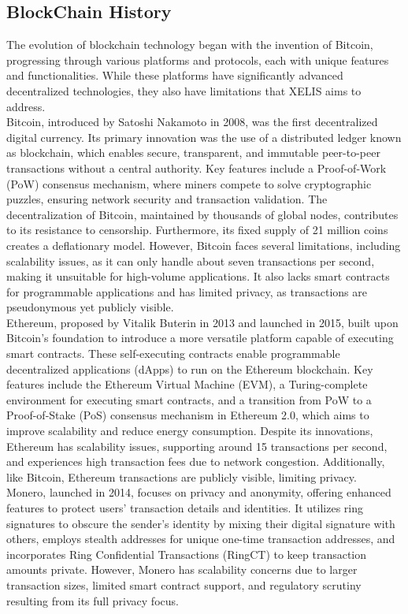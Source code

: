 \documentclass[12pt,a4paper,twocolumn]{article}
\begin{document}
\subsection{BlockChain History}
The evolution of blockchain technology began with the invention of Bitcoin, progressing through various platforms and protocols, each with unique features and functionalities. While these platforms have significantly advanced decentralized technologies, they also have limitations that XELIS aims to address.\\

Bitcoin, introduced by Satoshi Nakamoto in 2008, was the first decentralized digital currency. Its primary innovation was the use of a distributed ledger known as blockchain, which enables secure, transparent, and immutable peer-to-peer transactions without a central authority. Key features include a Proof-of-Work (PoW) consensus mechanism, where miners compete to solve cryptographic puzzles, ensuring network security and transaction validation. The decentralization of Bitcoin, maintained by thousands of global nodes, contributes to its resistance to censorship. Furthermore, its fixed supply of 21 million coins creates a deflationary model. However, Bitcoin faces several limitations, including scalability issues, as it can only handle about seven transactions per second, making it unsuitable for high-volume applications. It also lacks smart contracts for programmable applications and has limited privacy, as transactions are pseudonymous yet publicly visible.\\

Ethereum, proposed by Vitalik Buterin in 2013 and launched in 2015, built upon Bitcoin’s foundation to introduce a more versatile platform capable of executing smart contracts. These self-executing contracts enable programmable decentralized applications (dApps) to run on the Ethereum blockchain. Key features include the Ethereum Virtual Machine (EVM), a Turing-complete environment for executing smart contracts, and a transition from PoW to a Proof-of-Stake (PoS) consensus mechanism in Ethereum 2.0, which aims to improve scalability and reduce energy consumption. Despite its innovations, Ethereum has scalability issues, supporting around 15 transactions per second, and experiences high transaction fees due to network congestion. Additionally, like Bitcoin, Ethereum transactions are publicly visible, limiting privacy.\\

Monero, launched in 2014, focuses on privacy and anonymity, offering enhanced features to protect users' transaction details and identities. It utilizes ring signatures to obscure the sender's identity by mixing their digital signature with others, employs stealth addresses for unique one-time transaction addresses, and incorporates Ring Confidential Transactions (RingCT) to keep transaction amounts private. However, Monero has scalability concerns due to larger transaction sizes, limited smart contract support, and regulatory scrutiny resulting from its full privacy focus.\\
\end{document}
